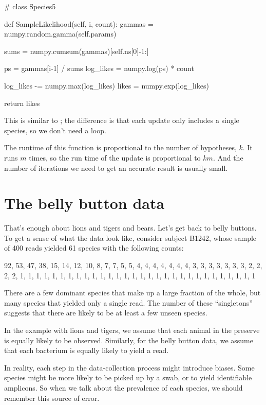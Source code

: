 \documentclass[12pt]{book}
\theoremstyle{exercise}
\begin{document}
\begin{code}
# class Species5

    def SampleLikelihood(self, i, count):
        gammas = numpy.random.gamma(self.params)

        sums = numpy.cumsum(gammas)[self.ns[0]-1:]

        ps = gammas[i-1] / sums
        log_likes = numpy.log(ps) * count

        log_likes -= numpy.max(log_likes)
        likes = numpy.exp(log_likes)

        return likes
\end{code}

This is similar to ; the
difference is that each update only includes a single species,
so we don't need a loop.

The runtime of this function is proportional to the number
of hypotheses, $k$.  It runs $m$ times, so the run time of
the update is proportional to $k m$.
And the number of iterations we
need to get an accurate result is usually small.


\section{The belly button data}
\label{belly}

That's enough about lions and tigers and bears.
Let's get back to belly buttons.  To get a sense of what the
data look like, consider subject B1242,
whose sample of 400 reads yielded 61 species with the following
counts:

\begin{code}
92, 53, 47, 38, 15, 14, 12, 10, 8, 7, 7, 5, 5, 
4, 4, 4, 4, 4, 4, 4, 3, 3, 3, 3, 3, 3, 3, 2, 2, 2, 2,
1, 1, 1, 1, 1, 1, 1, 1, 1, 1, 1, 1, 1, 1, 1, 1, 1, 1,
1, 1, 1, 1, 1, 1, 1, 1, 1, 1, 1, 1
\end{code}

There are a few dominant species that make up a large
fraction of the whole, but many species that yielded only
a single read.  The number of these ``singletons'' suggests
that there are likely to be at least a few unseen species.

In the example with lions and tigers, we assume that each
animal in the preserve is equally likely to be observed.
Similarly, for the belly button data, we assume that each
bacterium is equally likely to yield a read.

In reality, each step in the data-collection
process might introduce biases.  Some species might
be more likely to be picked up by a swab, or to yield identifiable
amplicons.  So when we talk about the prevalence of each species,
we should remember this source of error.
\end{document}
